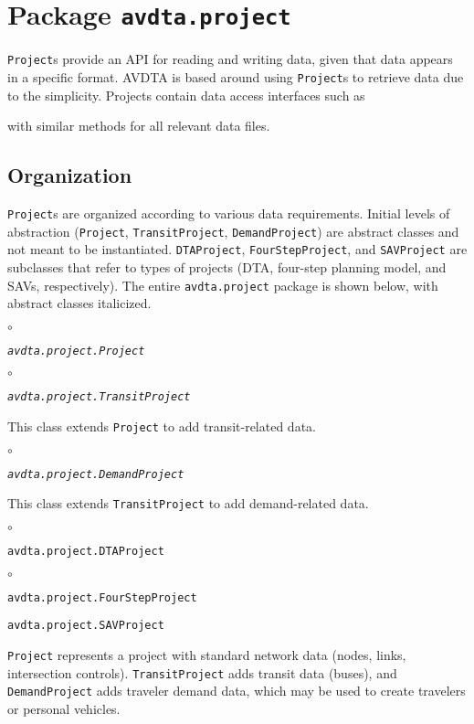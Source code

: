 \chapter{Package \texttt{avdta.project}}
\label{api:project}

\texttt{Project}s provide an API for reading and writing data, given that data appears in a specific format. AVDTA is based around using \texttt{Project}s to retrieve data due to the simplicity. {Project}s contain data access interfaces such as 
\begin{algorithmic}[1]
\end{algorithmic}
with similar methods for all relevant data files. 

\section{Organization}
\texttt{Project}s are organized according to various data requirements. Initial levels of abstraction (\texttt{Project}, \texttt{TransitProject}, \texttt{DemandProject}) are abstract classes and not meant to be instantiated. \texttt{DTAProject}, \texttt{FourStepProject}, and \texttt{SAVProject} are subclasses that refer to types of projects (DTA, four-step planning model, and SAVs, respectively). The entire \texttt{avdta.project} package is shown below, with abstract classes italicized.
%
\begin{list}{$\circ$}{}
	\item \textit{\texttt{avdta.project.Project}}
	\begin{list}{$\circ$}{}
		\item \textit{\texttt{avdta.project.TransitProject}}
		
		This class extends \texttt{Project} to add transit-related data.
		
		\begin{list}{$\circ$}{}
			\item \textit{\texttt{avdta.project.DemandProject}}
			
			This class extends \texttt{TransitProject} to add demand-related data.
			
			\begin{list}{$\circ$}{}
				\item \texttt{avdta.project.DTAProject}
				
				\begin{list}{$\circ$}{}
					\item \texttt{avdta.project.FourStepProject}
				\end{list}
			
				\item \texttt{avdta.project.SAVProject}
			\end{list}
		\end{list}
	\end{list}
\end{list}
%
\texttt{Project} represents a project with standard network data (nodes, links, intersection controls). \texttt{TransitProject} adds transit data (buses), and \texttt{DemandProject} adds traveler demand data, which may be used to create travelers or personal vehicles.

